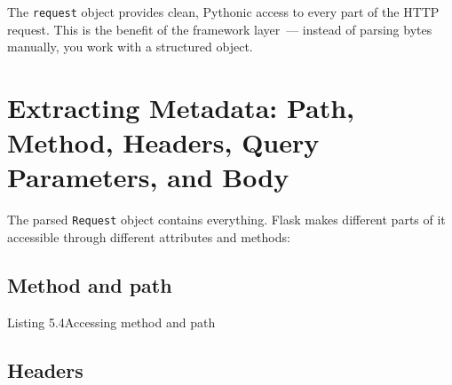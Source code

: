 \noindent{}The \texttt{request} object provides clean, Pythonic access to every part of the HTTP request. This is the benefit of the framework layer~--- instead of parsing bytes manually, you work with a structured object.

\setcounter{section}{3}
\section{Extracting Metadata: Path, Method, Headers, Query Parameters, and Body}\label{05-internal-request-execution:54-extracting-metadata-path-method-headers-query-parameters-and-body}

The parsed \texttt{Request} object contains everything. Flask makes different parts of it accessible through different attributes and methods:

\subsection*{Method and path}\label{05-internal-request-execution:method-and-path}

\begin{codeboxcap}[short]{\textcolor{accent}{Listing 5.4}\enspace Accessing method and path}

\begin{Shaded}
\begin{Highlighting}[]
\end{Highlighting}
\end{Shaded}

\end{codeboxcap}

\subsection*{Headers}\label{05-internal-request-execution:headers}

